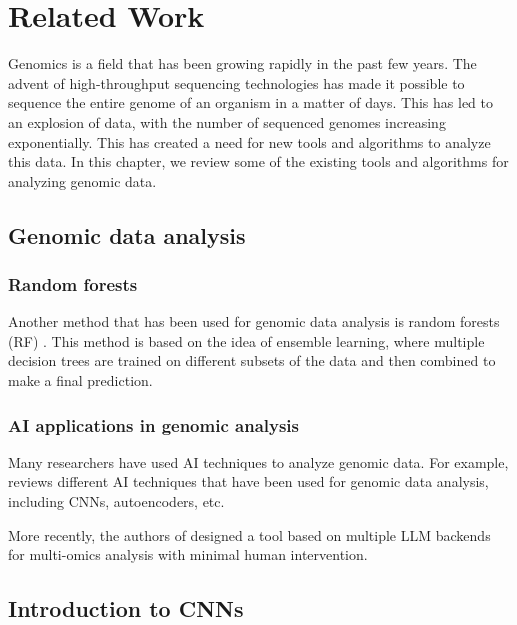 \chapter{Related Work}
\label{chap:related-work}

Genomics is a field that has been growing rapidly in the past few years. The advent of high-throughput
sequencing technologies has made it possible to sequence the entire genome of an organism in a matter
of days. This has led to an explosion of data, with the number of sequenced genomes increasing exponentially.
This has created a need for new tools and algorithms to analyze this data. In this chapter, we review
some of the existing tools and algorithms for analyzing genomic data.

\section{Genomic data analysis}
\label{sec:genomic-data-analysis}

\subsection*{Random forests}
\label{subsec:random-forests}

Another method that has been used for genomic data analysis is random forests (RF) \cite{Chen-Ishwaran-2012}.
This method is based on the idea of ensemble learning, where multiple decision trees are trained on different
subsets of the data and then combined to make a final prediction.

\subsection*{AI applications in genomic analysis}
\label{sec:ai-applications-in-genomic-analysis}

Many researchers have used AI techniques to analyze genomic data. For example, \cite{Caudai-et-al-2021} reviews
different AI techniques that have been used for genomic data analysis, including CNNs, autoencoders, etc.

More recently, the authors of \cite{Zhou-et-al-2024} designed a tool based on multiple LLM backends for multi-omics
analysis with minimal human intervention.

\section{Introduction to CNNs}
\label{sec:intro_cnn}


